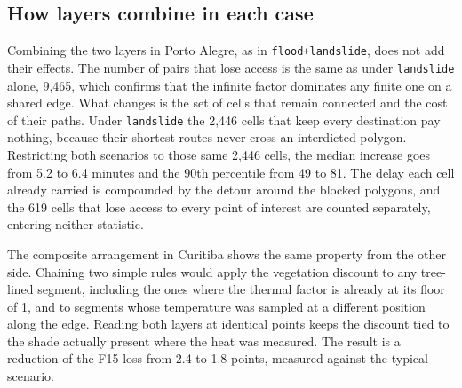 \subsection{How layers combine in each case}
\label{subsec:results-composition}

Combining the two layers in Porto Alegre, as in \texttt{flood+landslide}, does not add their effects. The number of pairs that lose access is the same as under \texttt{landslide} alone, 9{,}465, which confirms that the infinite factor dominates any finite one on a shared edge. What changes is the set of cells that remain connected and the cost of their paths. Under \texttt{landslide} the 2{,}446 cells that keep every destination pay nothing, because their shortest routes never cross an interdicted polygon. Restricting both scenarios to those same 2{,}446 cells, the median increase goes from 5.2 to 6.4 minutes and the 90th percentile from 49 to 81. The delay each cell already carried is compounded by the detour around the blocked polygons, and the 619 cells that lose access to every point of interest are counted separately, entering neither statistic.

The composite arrangement in Curitiba shows the same property from the other side. Chaining two simple rules would apply the vegetation discount to any tree-lined segment, including the ones where the thermal factor is already at its floor of 1, and to segments whose temperature was sampled at a different position along the edge. Reading both layers at identical points keeps the discount tied to the shade actually present where the heat was measured. The result is a reduction of the F15 loss from 2.4 to 1.8 points, measured against the typical scenario.
